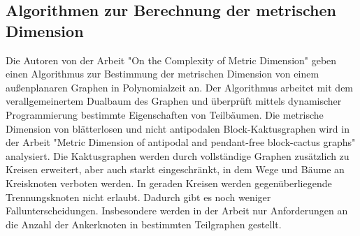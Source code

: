 \subsection{Algorithmen zur Berechnung der metrischen Dimension}
\vspace{-2mm}
Die Autoren von der Arbeit "On the Complexity of Metric Dimension" \cite{aussenplanar} geben einen Algorithmus zur Bestimmung der metrischen Dimension von einem außenplanaren Graphen in Polynomialzeit an. Der Algorithmus arbeitet mit dem verallgemeinertem Dualbaum des Graphen und überprüft mittels dynamischer Programmierung bestimmte Eigenschaften von Teilbäumen. 
\vspace{-1mm}
\newline\newline
Die metrische Dimension von blätterlosen und nicht antipodalen Block-Kaktusgraphen wird in der Arbeit "Metric Dimension of antipodal and pendant-free block-cactus graphs" \cite{cactusblock} analysiert. Die Kaktusgraphen werden durch vollständige Graphen zusätzlich zu Kreisen erweitert, aber auch starkt eingeschränkt, in dem Wege und Bäume an Kreisknoten verboten werden. In geraden Kreisen werden gegenüberliegende Trennungsknoten nicht erlaubt. Dadurch gibt es noch weniger Fallunterscheidungen. Insbesondere werden in der Arbeit nur Anforderungen an die Anzahl der Ankerknoten in bestimmten Teilgraphen gestellt.
\vspace{-5mm}
